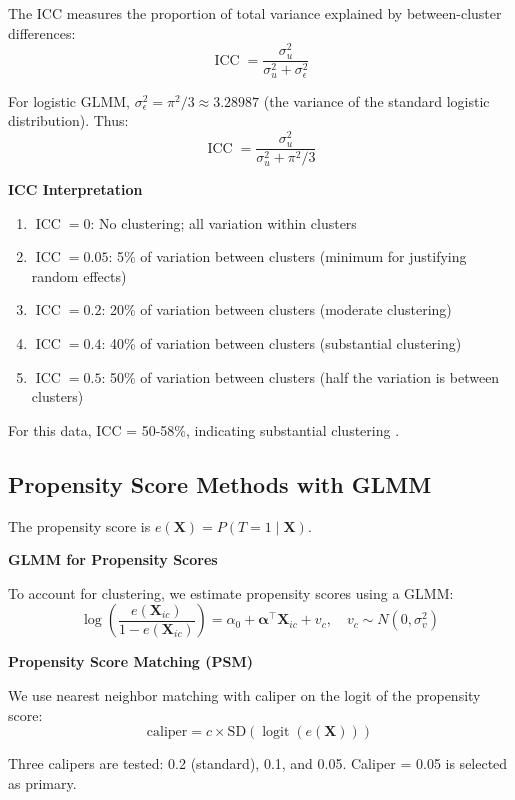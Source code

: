 The ICC measures the proportion of total variance explained by between-cluster differences:
\[
\operatorname{ICC} = \frac{\sigma_u^2}{\sigma_u^2 + \sigma_\epsilon^2}
\]

For logistic GLMM, $\sigma_\epsilon^2 = \pi^2/3 \approx 3.28987$ (the variance of the standard logistic distribution). Thus:
\[
\operatorname{ICC} = \frac{\sigma_u^2}{\sigma_u^2 + \pi^2/3}
\]

\textbf{ICC Interpretation}

\begin{enumerate}
	\item $\operatorname{ICC} = 0$: No clustering; all variation within clusters
	\item $\operatorname{ICC} = 0.05$: 5\% of variation between clusters (minimum for justifying random effects)
	\item $\operatorname{ICC} = 0.2$: 20\% of variation between clusters (moderate clustering)
	\item $\operatorname{ICC} = 0.4$: 40\% of variation between clusters (substantial clustering)
	\item $\operatorname{ICC} = 0.5$: 50\% of variation between clusters (half the variation is between clusters)
\end{enumerate}

For this data, ICC = 50-58\%, indicating substantial clustering \citep{killip2004intracluster}.

\subsection{Propensity Score Methods with GLMM}

The propensity score \citep{rosenbaum1983central} is $e(\mathbf{X}) = P(T = 1 \mid \mathbf{X})$.

\textbf{GLMM for Propensity Scores}

To account for clustering, we estimate propensity scores using a GLMM:
\[
\log\left(\frac{e(\mathbf{X}_{ic})}{1 - e(\mathbf{X}_{ic})}\right) = \alpha_0 + \boldsymbol{\alpha}^\top \mathbf{X}_{ic} + v_c, \quad v_c \sim N(0, \sigma_v^2)
\]

\textbf{Propensity Score Matching (PSM)}

We use nearest neighbor matching with caliper on the logit of the propensity score:
\[
\text{caliper} = c \times \text{SD}(\operatorname{logit}(e(\mathbf{X})))
\]

Three calipers are tested: 0.2 (standard), 0.1, and 0.05. Caliper = 0.05 is selected as primary.

